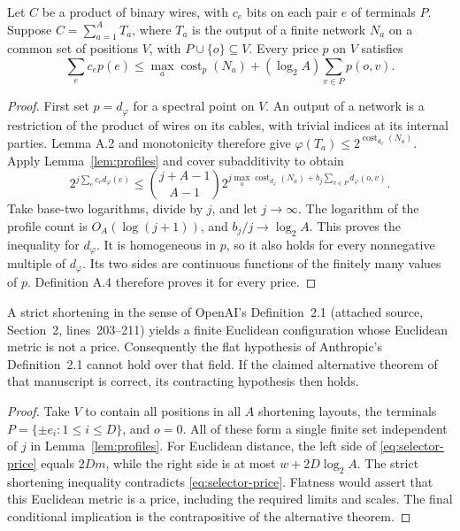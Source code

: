 \begin{theorem}
\label{thm:selector-price}
Let $C$ be a product of binary wires, with $c_e$ bits on each pair $e$ of
terminals $P$.  Suppose $C=\sum_{a=1}^A T_a$, where $T_a$ is the output of
a finite network $N_a$ on a common set of positions $V$, with
$P\cup\{o\}\subseteq V$.  Every price $p$ on $V$ satisfies
\begin{equation}
\label{eq:selector-price}
 \sum_e c_e p(e)
 \le \max_a\operatorname{cost}_p(N_a)
       +(\log_2 A)\sum_{v\in P}p(o,v).
\end{equation}
\end{theorem}
\begin{proof}
First set $p=d_\varphi$ for a spectral point on $V$.  An output of a
network is a restriction of the product of wires on its cables, with
trivial indices at its internal parties.  Lemma A.2 and monotonicity
therefore give $\varphi(T_a)\le2^{\operatorname{cost}_{d_\varphi}(N_a)}$.
Apply Lemma~\ref{lem:profiles} and cover subadditivity to obtain
\[
 2^{j\sum_e c_e d_\varphi(e)}
 \le \binom{j+A-1}{A-1}
 2^{j\max_a\operatorname{cost}_{d_\varphi}(N_a)
       +b_j\sum_{v\in P}d_\varphi(o,v)}.
\]
Take base-two logarithms, divide by $j$, and let $j\to\infty$.
The logarithm of the profile count is $O_A(\log(j+1))$, and
$b_j/j\to\log_2 A$.  This proves the inequality for $d_\varphi$.
It is homogeneous in $p$, so it also holds for every nonnegative multiple
of $d_\varphi$.  Its two sides are continuous functions of the finitely
many values of $p$.  Definition A.4 therefore proves it for every price.
\end{proof}

\begin{corollary}
\label{cor:shortening-not-flat}
A strict shortening in the sense of OpenAI's Definition~2.1 (attached
source, Section~2, lines~203--211) yields a finite Euclidean configuration
whose Euclidean metric is not a price.  Consequently the flat hypothesis
of Anthropic's Definition~2.1 cannot hold over that field.  If the claimed
alternative theorem of that manuscript is correct, its contracting
hypothesis then holds.
\end{corollary}
\begin{proof}
Take $V$ to contain all positions in all $A$ shortening layouts, the
terminals $P=\{\pm e_i:1\le i\le D\}$, and $o=0$.  All of these form a
single finite set independent of $j$ in Lemma~\ref{lem:profiles}.
For Euclidean distance, the left side of
\eqref{eq:selector-price} equals $2Dm$, while the right side is at most
$w+2D\log_2 A$.  The strict shortening inequality contradicts
\eqref{eq:selector-price}.  Flatness would assert that this Euclidean
metric is a price, including the required limits and scales.  The final
conditional implication is the contrapositive of the alternative theorem.
\end{proof}

